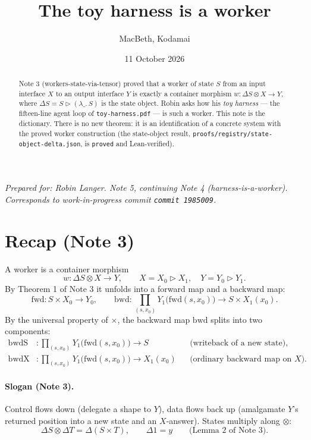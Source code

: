 \documentclass[11pt]{article}
\title{The toy harness is a worker}
\author{MacBeth, Kodamai}
\date{11 October 2026}
\theoremstyle{plain}
\theoremstyle{definition}
\theoremstyle{remark}
\newcommand{\state}{\Delta}
\begin{document}
\maketitle

\begin{center}
\emph{Prepared for: Robin Langer. Note 5, continuing Note 4 (harness-is-a-worker).}\\
\emph{Corresponds to work-in-progress commit \texttt{commit 1985009}.}
\end{center}

\begin{abstract}
Note 3 (workers-state-via-tensor) proved that a worker of state $S$ from an input
interface $X$ to an output interface $Y$ is exactly a container morphism
$w : \state S \otimes X \to Y$, where $\state S = S \triangleright (\lambda\_.\,S)$ is the
state object. Robin asks how his \emph{toy harness} --- the fifteen-line agent loop of
\texttt{toy-harness.pdf} --- is such a worker. This note is the dictionary. There is no
new theorem: it is an identification of a concrete system with the proved worker
construction (the state-object result, \texttt{proofs/registry/state-object-delta.json},
is \texttt{proved} and Lean-verified).
\end{abstract}

\section{Recap (Note 3)}

A worker is a container morphism
\[
  w : \state S \otimes X \longrightarrow Y,
  \qquad X = X_0 \triangleright X_1, \quad Y = Y_0 \triangleright Y_1 .
\]
By Theorem 1 of Note 3 it unfolds into a forward map and a backward map:
\[
  \mathrm{fwd} : S \times X_0 \longrightarrow Y_0,
  \qquad
  \mathrm{bwd} : \prod_{(s,x_0)} Y_1\bigl(\mathrm{fwd}(s,x_0)\bigr)
    \longrightarrow S \times X_1(x_0).
\]
By the universal property of $\times$, the backward map $\mathrm{bwd}$ splits into two
components:
\begin{align*}
  \mathrm{bwdS} &: \prod_{(s,x_0)} Y_1\bigl(\mathrm{fwd}(s,x_0)\bigr) \longrightarrow S
    && \text{(writeback of a new state),}\\
  \mathrm{bwdX} &: \prod_{(s,x_0)} Y_1\bigl(\mathrm{fwd}(s,x_0)\bigr) \longrightarrow X_1(x_0)
    && \text{(ordinary backward map on $X$).}
\end{align*}

\paragraph{Slogan (Note 3).} Control flows down (delegate a shape to $Y$), data flows back
up (amalgamate $Y$'s returned position into a new state and an $X$-answer). States multiply
along $\otimes$:
\[
  \state S \otimes \state T = \state(S \times T),
  \qquad
  \state 1 = y
  \qquad\text{(Lemma 2 of Note 3).}
\]
\end{document}
